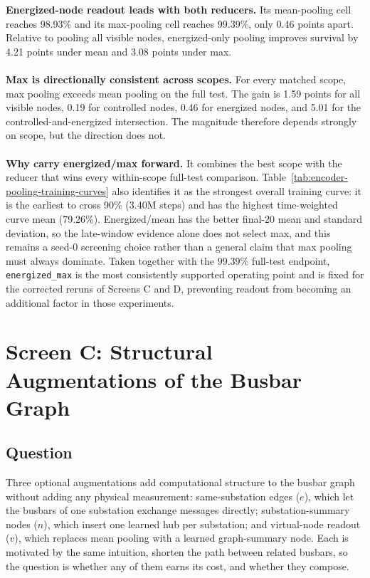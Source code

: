 \textbf{Energized-node readout leads with both reducers.} Its mean-pooling cell
reaches 98.93\% and its max-pooling cell reaches 99.39\%, only 0.46 points
apart. Relative to pooling all visible nodes, energized-only pooling improves
survival by 4.21 points under mean and 3.08 points under max.
\\
\\
\textbf{Max is directionally consistent across scopes.} For every matched
scope, max pooling exceeds mean pooling on the full test. The gain is 1.59
points for all visible nodes, 0.19 for controlled nodes, 0.46 for energized
nodes, and 5.01 for the controlled-and-energized intersection. The magnitude
therefore depends strongly on scope, but the direction does not.
\\
\\
\textbf{Why carry energized/max forward.} It combines the best scope with the
reducer that wins every within-scope full-test comparison. Table~\ref{tab:encoder-pooling-training-curves}
also identifies it as the strongest overall training curve: it is the earliest
to cross 90\% (3.40M steps) and has the highest time-weighted curve mean
(79.26\%). Energized/mean has the better final-20 mean and standard deviation,
so the late-window evidence alone does not select max, and this remains a
seed-0 screening choice rather than a general claim that max pooling must
always dominate. Taken together with the 99.39\% full-test endpoint,
\texttt{energized\_max} is the most consistently supported operating point and
is fixed for the corrected reruns of Screens C and D, preventing readout from
becoming an additional factor in those experiments.

\section{Screen C: Structural Augmentations of the Busbar Graph}
\label{sec:screen-bus-structure}

\subsection*{Question}

Three optional augmentations add computational structure to the busbar graph
without adding any physical measurement: same-substation edges ($e$), which let
the busbars of one substation exchange messages directly; substation-summary
nodes ($n$), which insert one learned hub per substation; and virtual-node
readout ($v$), which replaces mean pooling with a learned graph-summary node.
Each is motivated by the same intuition, shorten the path between related
busbars, so the question is whether any of them earns its cost, and whether
they compose.

